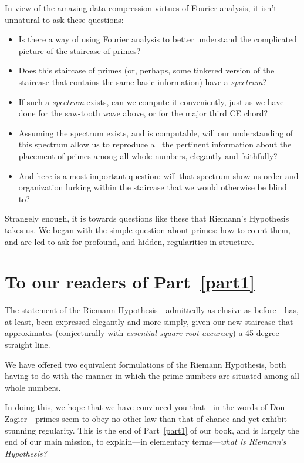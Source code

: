\documentclass[openany]{book}
\theoremstyle{plain}
\theoremstyle{definition}
\newcommand{\RH}{Riemann Hypothesis\index{Riemann Hypothesis}}
\begin{document}
In view of the amazing data-compression virtues of Fourier analysis,
it isn't unnatural to ask these questions:

\begin{itemize}
\item Is there a way of using Fourier analysis to better understand
  the complicated picture of the staircase of primes?

\item Does this staircase of primes (or, perhaps, some tinkered
  version of the staircase that contains the same basic information)
  have a {\it spectrum}?

\item If such a {\it spectrum} exists, can we compute it conveniently,
  just as we have done for the saw-tooth wave above, or for the major
  third CE chord?


\item Assuming the spectrum exists, and is computable, will our
  understanding of this spectrum allow us to reproduce all the
  pertinent information about the placement of primes among all whole
  numbers, elegantly and faithfully?

\item And here is a most important question: will that spectrum show
  us order and organization lurking within the staircase that we would
  otherwise be blind to?

\end{itemize}


Strangely enough, it is towards questions like these that Riemann's
Hypothesis takes us. We began with the simple question about primes:
how to count them, and are led to ask for profound, and hidden,
regularities in structure.

\chapter{To our readers of Part~\ref{part1}}
The statement of the \RH{}---admittedly as elusive as
before---has, at least, been expressed elegantly and more simply,
given our new staircase that approximates (conjecturally with {\em
  essential square root accuracy}) a 45 degree straight line.

We have offered two equivalent formulations of the \RH{},
both having to do with the manner in which the prime numbers are
situated among all whole numbers.

In doing this, we hope that we have convinced you that---in the words
of Don Zagier---primes seem to obey no other law than that of chance
and yet exhibit stunning regularity.  This is the end of Part~\ref{part1} of our
book, and is largely the end of our main mission, to explain---in
elementary terms---{\em what is Riemann's Hypothesis?}
\end{document}
